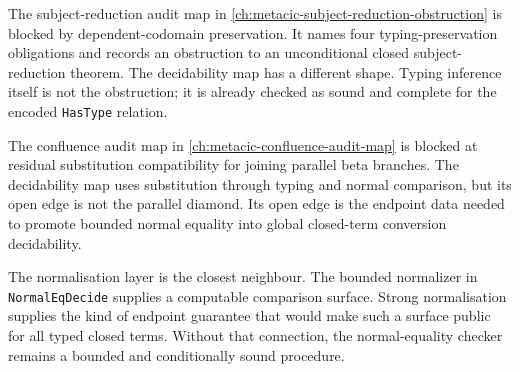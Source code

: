 The subject-reduction audit map in
\autoref{ch:metacic-subject-reduction-obstruction} is blocked by
dependent-codomain preservation. It names four typing-preservation
obligations and records an obstruction to an unconditional closed
subject-reduction theorem. The decidability map has a different shape. Typing
inference itself is not the obstruction; it is already checked as sound and
complete for the encoded \texttt{HasType} relation.

The confluence audit map in \autoref{ch:metacic-confluence-audit-map} is
blocked at residual substitution compatibility for joining parallel beta
branches. The decidability map uses substitution through typing and normal
comparison, but its open edge is not the parallel diamond. Its open edge is
the endpoint data needed to promote bounded normal equality into global
closed-term conversion decidability.

The normalisation layer is the closest neighbour. The bounded normalizer in
\texttt{NormalEqDecide} supplies a computable comparison surface. Strong
normalisation supplies the kind of endpoint guarantee that would make such a
surface public for all typed closed terms. Without that connection, the
normal-equality checker remains a bounded and conditionally sound procedure.

